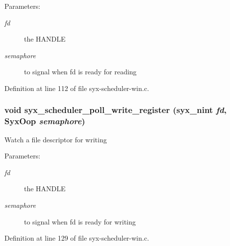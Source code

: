 \begin{Desc}
\item[Parameters:]
\begin{description}
\item[{\em fd}]the HANDLE \item[{\em semaphore}]to signal when fd is ready for reading \end{description}
\end{Desc}


Definition at line 112 of file syx-scheduler-win.c.\hypertarget{syx-scheduler-win_8c_28eac1f77d3be9549426a9166ac5a9f3}{
\subsubsection{\setlength{\rightskip}{0pt plus 5cm}void syx\_\-scheduler\_\-poll\_\-write\_\-register ({\bf syx\_\-nint} {\em fd}, \/  {\bf SyxOop} {\em semaphore})}}
\label{syx-scheduler-win_8c_28eac1f77d3be9549426a9166ac5a9f3}


Watch a file descriptor for writing

\begin{Desc}
\item[Parameters:]
\begin{description}
\item[{\em fd}]the HANDLE \item[{\em semaphore}]to signal when fd is ready for writing \end{description}
\end{Desc}


Definition at line 129 of file syx-scheduler-win.c.